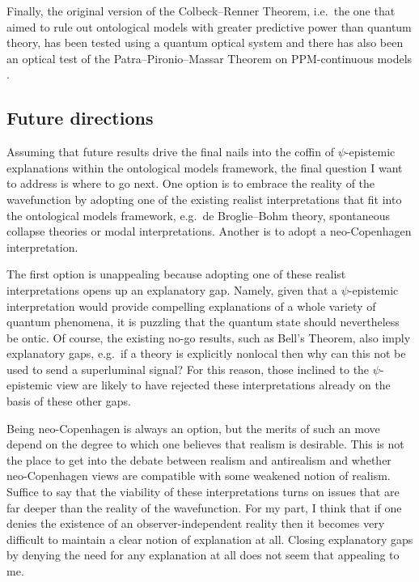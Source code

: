 \documentclass[DIV=calc,paper=a4,fontsize=11pt,twocolumn]{scrartcl} %
\theoremstyle{definition}
\theoremstyle{plain}
\begin{document}
Finally, the original version of the Colbeck--Renner Theorem, i.e.\ the
one that aimed to rule out ontological models with greater predictive
power than quantum theory, has been tested using a quantum optical
system \cite{Stuart2012} and there has also been an optical test of
the Patra--Pironio--Massar Theorem on PPM-continuous models
\cite{Patra2013}.

\subsection{Future directions}

Assuming that future results drive the final nails into the coffin of
$\psi$-epistemic explanations within the ontological models framework,
the final question I want to address is where to go next.  One option
is to embrace the reality of the wavefunction by adopting one of the
existing realist interpretations that fit into the ontological models
framework, e.g.\ de Broglie--Bohm theory, spontaneous collapse theories
or modal interpretations.  Another is to adopt a neo-Copenhagen
interpretation.

The first option is unappealing because adopting one of these realist
interpretations opens up an explanatory gap.  Namely, given that a
$\psi$-epistemic interpretation would provide compelling explanations
of a whole variety of quantum phenomena, it is puzzling that the
quantum state should nevertheless be ontic.  Of course, the existing
no-go results, such as Bell's Theorem, also imply explanatory gaps,
e.g.\ if a theory is explicitly nonlocal then why can this not be used
to send a superluminal signal?  For this reason, those inclined to the
$\psi$-epistemic view are likely to have rejected these
interpretations already on the basis of these other gaps.

Being neo-Copenhagen is always an option, but the merits of such an
move depend on the degree to which one believes that realism is
desirable.  This is not the place to get into the debate between
realism and antirealism and whether neo-Copenhagen views are
compatible with some weakened notion of realism.  Suffice to say that
the viability of these interpretations turns on issues that are far
deeper than the reality of the wavefunction.  For my part, I think
that if one denies the existence of an observer-independent reality
then it becomes very difficult to maintain a clear notion of
explanation at all.  Closing explanatory gaps by denying the need for
any explanation at all does not seem that appealing to me.
\end{document}
